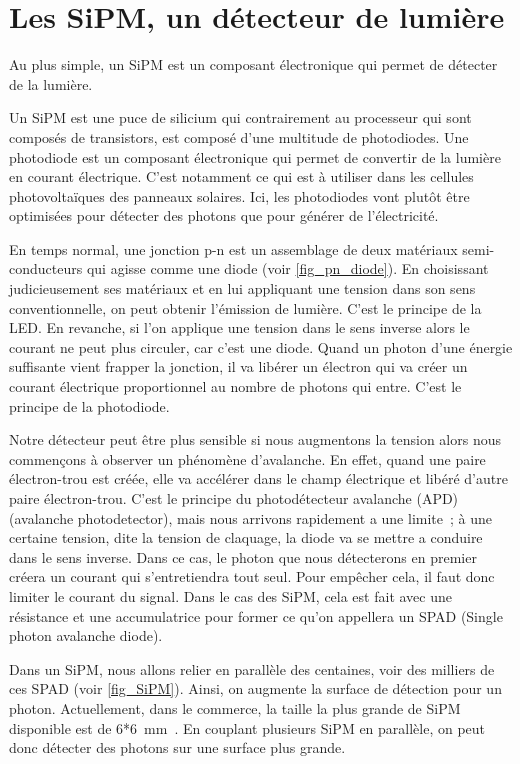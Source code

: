 \section{Les SiPM, un détecteur de lumière}
Au plus simple, un SiPM est un composant électronique qui permet de détecter de la lumière.

Un SiPM est une puce de silicium qui contrairement au processeur qui sont composés de transistors, est composé d'une multitude de photodiodes. Une photodiode est un composant électronique qui permet de convertir de la lumière en courant électrique. C'est notamment ce qui est à utiliser dans les cellules photovoltaïques des panneaux solaires. Ici, les photodiodes vont plutôt être optimisées pour détecter des photons que pour générer de l'électricité.

En temps normal, une jonction p-n est un assemblage de deux matériaux semi-conducteurs qui agisse comme une diode (voir \cref{fig_pn_diode}). En choisissant judicieusement ses matériaux et en lui appliquant une tension dans son sens conventionnelle, on peut obtenir l'émission de lumière. C'est le principe de la LED. En revanche, si l’on applique une tension dans le sens inverse alors le courant ne peut plus circuler, car c'est une diode. Quand un photon d'une énergie suffisante vient frapper la jonction, il va libérer un électron qui va créer un courant électrique proportionnel au nombre de photons qui entre. C'est le principe de la photodiode.

Notre détecteur peut être plus sensible si nous augmentons la tension alors nous commençons à observer un phénomène d'avalanche. En effet, quand une paire électron-trou est créée, elle va accélérer dans le champ électrique et libéré d'autre paire électron-trou. C'est le principe du photodétecteur avalanche (APD)
(avalanche photodetector), mais nous arrivons rapidement a une limite~; à une certaine tension, dite la tension de claquage, la diode va se mettre a conduire dans le sens inverse. Dans ce cas, le photon que nous détecterons en premier créera un courant qui s'entretiendra tout seul. Pour empêcher cela, il faut donc limiter le courant du signal. Dans le cas des SiPM, cela est fait avec une résistance et une accumulatrice pour former ce qu'on appellera un SPAD (Single photon avalanche diode).

Dans un SiPM, nous allons relier en parallèle des centaines, voir des milliers de ces SPAD (voir \cref{fig_SiPM}). Ainsi, on augmente la surface de détection pour un photon. Actuellement, dans le commerce, la taille la plus grande de SiPM disponible est de 6*6~mm~\cite{site:sipm_vendor}. En couplant plusieurs SiPM en parallèle, on peut donc détecter des photons sur une surface plus grande.

